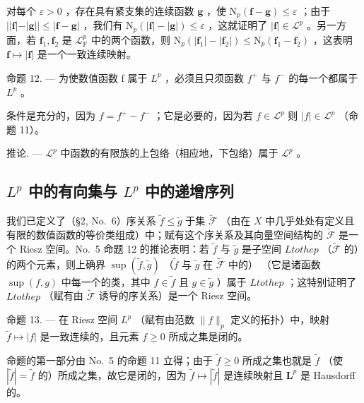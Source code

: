 对每个 \(\varepsilon > 0\) ，存在具有紧支集的连续函数 \(\mathbf{g}\) ，使 \(\mathrm{N}_p(\mathbf{f} - \mathbf{g}) \leqslant \varepsilon\) ；由于 \(||\mathbf{f}| - |\mathbf{g}|| \leqslant |\mathbf{f} - \mathbf{g}|\) ，我们有 \(\mathrm{N}_p(|\mathbf{f}| - |\mathbf{g}|) \leqslant \varepsilon\) ，这就证明了 \(|\mathbf{f}| \in \mathcal{L}^p\) 。另一方面，若 \(\mathbf{f}_1, \mathbf{f}_2\) 是 \(\mathcal{L}_{\mathrm{F}}^p\) 中的两个函数，则 \(\mathrm{N}_p(|\mathbf{f}_1| - |\mathbf{f}_2|) \leqslant \mathrm{N}_p(\mathbf{f}_1 - \mathbf{f}_2)\) ，这表明 \(\mathbf{f} \mapsto |\mathbf{f}|\) 是一个一致连续映射。

命题 12. --- 为使数值函数 f 属于 \(L^{p}\) ，必须且只须函数 \(f^{+}\) 与 \(f^{-}\) 的每一个都属于 \(L^{p}\) 。

条件是充分的，因为 \(f = f^{+} - f^{-}\) ；它是必要的，因为若 \(f \in \mathcal{L}^p\) 则 \(|f| \in \mathcal{L}^p\) （命题 11）。

推论. --- \(\mathcal{L}^{p}\) 中函数的有限族的上包络（相应地，下包络）属于 \(\mathcal{L}^{p}\) 。

\subsection{\texorpdfstring{\(L^{p}\) 中的有向集与 \(L^{p}\) 中的递增序列}{L to the p 中的有向集与 L to the p 中的递增序列}}

我们已定义了（§2, No.~6）序关系 \(\widetilde{f} \leqslant \widetilde{g}\) 于集 \(\widetilde{\mathcal{F}}\) （由在 \(X\) 中几乎处处有定义且有限的数值函数的等价类组成）中；赋有这个序关系及其向量空间结构的 \(\widetilde{\mathcal{F}}\) 是一个 Riesz 空间。No.~5 命题 12 的推论表明：若 \(\widetilde{f}\) 与 \(\widetilde{g}\) 是子空间 \(L to the p\) （\(\widetilde{\mathcal{F}}\) 的）的两个元素，则上确界 \(\sup (\widetilde{f}, \widetilde{g})\) （\(\widetilde{f}\) 与 \(\widetilde{g}\) 在 \(\widetilde{\mathcal{F}}\) 中的） （它是诸函数 \(\sup (f, g)\) 中每一个的类，其中 \(f \in \widetilde{f}\) 且 \(g \in \widetilde{g}\) ）属于 \(L to the p\) ；这特别证明了 \(L to the p\) （赋有由 \(\widetilde{\mathcal{F}}\) 诱导的序关系）是一个 Riesz 空间。

命题 13. --- 在 Riesz 空间 \(L^{p}\) （赋有由范数 \(\|f\|_{p}\) 定义的拓扑）中，映射 \(\widetilde{f} \mapsto |f|\) 是一致连续的，且元素 \(f \geqslant 0\) 所成之集是闭的。

命题的第一部分由 No.~5 的命题 11 立得；由于 \(\widetilde{f} \geqslant 0\) 所成之集也就是 \(\widetilde{f}\) （使 \(|\widetilde{f}| = \widetilde{f}\) 的）所成之集，故它是闭的，因为 \(\widetilde{f} \mapsto |\widetilde{f}|\) 是连续映射且 \(\mathbf{L}^p\) 是 Hausdorff 的。

